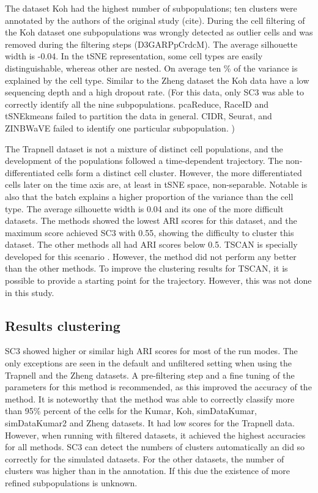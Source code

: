 \documentclass[11pt, a4paper]{article}\usepackage[]{graphicx}\usepackage[]{color}
\begin{document}
The dataset Koh had the highest number of subpopulations;  ten clusters were annotated by the authors of the original study (cite). During the cell filtering of the Koh dataset one subpopulations was wrongly detected as outlier cells and was removed during the filtering steps (D3GARPpCrdcM). The average silhouette width is -0.04. In the tSNE representation, some cell types are easily distinguishable, whereas other are nested. On average ten \% of the variance is explained by the cell type. Similar to the Zheng dataset the Koh data have a low sequencing depth and a high dropout rate.  (For this data, only SC3 was able to correctly identify all the nine subpopulations. pcaReduce, RaceID and tSNEkmeans failed to partition the data in general. CIDR, Seurat, and ZINBWaVE failed to identify one particular subpopulation. )

The Trapnell dataset is not a mixture of distinct cell populations, and the development of the populations followed a time-dependent trajectory. The non-differentiated cells form a distinct cell cluster. However, the more differentiated cells later on the time axis are, at least in tSNE space, non-separable. Notable is also that the batch explains a higher proportion of the variance than the cell type.  The average silhouette width is 0.04 and its one of the more difficult datasets. The methods showed the lowest ARI scores for this dataset, and the maximum score achieved SC3 with 0.55, showing the difficulty to cluster this dataset. The other methods all had ARI scores below 0.5. TSCAN is specially developed for this scenario \citep{ji2015tscan}. However, the method did not perform any better than the other methods. To improve the clustering results for TSCAN, it is possible to provide a starting point for the trajectory. However, this was not done in this study. 



\subsection{Results clustering}
SC3 showed higher or similar high ARI scores for most of the run modes. The only exceptions are seen in the default and unfiltered setting when using the Trapnell and the Zheng datasets. A pre-filtering step and a fine tuning of the parameters for this method is recommended, as this improved the accuracy of the method. It is noteworthy that the method was able to correctly classify more than 95\% percent of the cells for the Kumar, Koh, simDataKumar, simDataKumar2 and Zheng datasets. It had low scores for the Trapnell data. However, when running with filtered datasets, it achieved the highest accuracies for all methods. SC3 can detect the numbers of clusters automatically an did so correctly for the simulated datasets. For the other datasets, the number of clusters was higher than in the annotation. If this due the existence of more refined subpopulations is unknown. 
\end{document}
